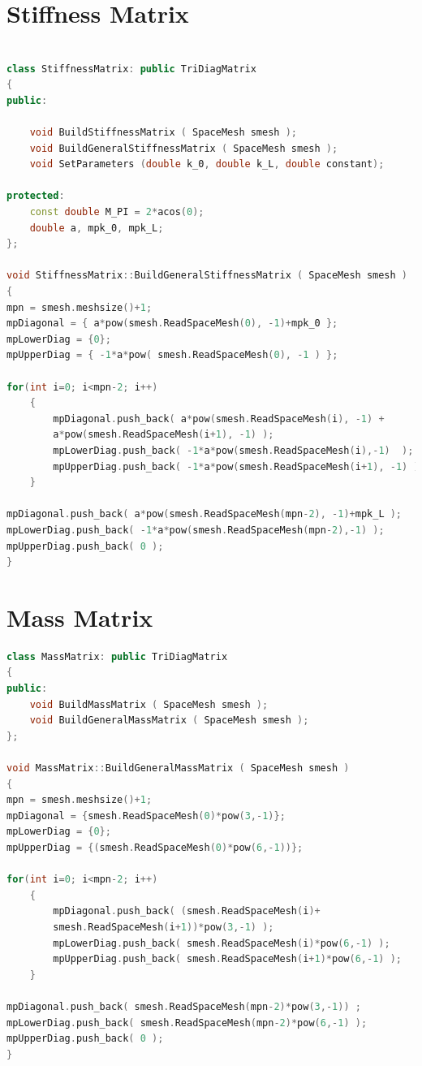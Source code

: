 \documentclass{uonmathreport}
\theoremstyle{definition}
\theoremstyle{problem}
\theoremstyle{theorem}
\begin{document}
\section{Stiffness Matrix} \label{app:Stiff}

\begin{lstlisting}[language=C++]

class StiffnessMatrix: public TriDiagMatrix
{
public:

    void BuildStiffnessMatrix ( SpaceMesh smesh );
    void BuildGeneralStiffnessMatrix ( SpaceMesh smesh );
    void SetParameters (double k_0, double k_L, double constant);

protected:
    const double M_PI = 2*acos(0);
    double a, mpk_0, mpk_L;
};

void StiffnessMatrix::BuildGeneralStiffnessMatrix ( SpaceMesh smesh )
{
mpn = smesh.meshsize()+1;
mpDiagonal = { a*pow(smesh.ReadSpaceMesh(0), -1)+mpk_0 };
mpLowerDiag = {0};
mpUpperDiag = { -1*a*pow( smesh.ReadSpaceMesh(0), -1 ) };

for(int i=0; i<mpn-2; i++)
    {
        mpDiagonal.push_back( a*pow(smesh.ReadSpaceMesh(i), -1) + 
        a*pow(smesh.ReadSpaceMesh(i+1), -1) );
        mpLowerDiag.push_back( -1*a*pow(smesh.ReadSpaceMesh(i),-1)  );
        mpUpperDiag.push_back( -1*a*pow(smesh.ReadSpaceMesh(i+1), -1) );
    }

mpDiagonal.push_back( a*pow(smesh.ReadSpaceMesh(mpn-2), -1)+mpk_L );
mpLowerDiag.push_back( -1*a*pow(smesh.ReadSpaceMesh(mpn-2),-1) );
mpUpperDiag.push_back( 0 );
}

\end{lstlisting}

\section{Mass Matrix} \label{app:Mass}

\begin{lstlisting}[language=C++]
class MassMatrix: public TriDiagMatrix
{
public:
    void BuildMassMatrix ( SpaceMesh smesh );
    void BuildGeneralMassMatrix ( SpaceMesh smesh );
};

void MassMatrix::BuildGeneralMassMatrix ( SpaceMesh smesh )
{
mpn = smesh.meshsize()+1;
mpDiagonal = {smesh.ReadSpaceMesh(0)*pow(3,-1)};
mpLowerDiag = {0};
mpUpperDiag = {(smesh.ReadSpaceMesh(0)*pow(6,-1))};

for(int i=0; i<mpn-2; i++)
    {
        mpDiagonal.push_back( (smesh.ReadSpaceMesh(i)+
        smesh.ReadSpaceMesh(i+1))*pow(3,-1) );
        mpLowerDiag.push_back( smesh.ReadSpaceMesh(i)*pow(6,-1) );
        mpUpperDiag.push_back( smesh.ReadSpaceMesh(i+1)*pow(6,-1) );
    }

mpDiagonal.push_back( smesh.ReadSpaceMesh(mpn-2)*pow(3,-1)) ;
mpLowerDiag.push_back( smesh.ReadSpaceMesh(mpn-2)*pow(6,-1) );
mpUpperDiag.push_back( 0 );
}

\end{lstlisting}
\end{document}
